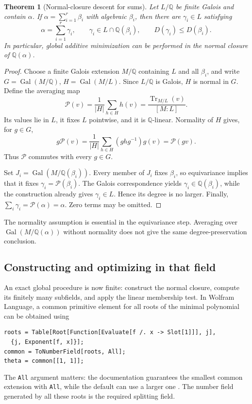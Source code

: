 \documentclass[11pt,letterpaper]{article}
\newtheorem{theorem}{Theorem}[section]
\theoremstyle{definition}
\theoremstyle{remark}
\newcommand{\Q}{\mathbb Q}
\newcommand{\Gal}{\operatorname{Gal}}
\newcommand{\Tr}{\operatorname{Tr}}
\newcommand{\wl}[1]{\texttt{#1}}
\begin{document}
\begin{theorem}[Normal-closure descent for sums]\label{thm:descent}
Let \(L/\Q\) be finite Galois and contain \(\alpha\). If
\(\alpha=\sum_{i=1}^r\beta_i\) with algebraic \(\beta_i\), then there
are \(\gamma_i\in L\) satisfying
\[
 \alpha=\sum_{i=1}^r\gamma_i,\qquad
 \gamma_i\in L\cap\Q(\beta_i),\qquad
 D(\gamma_i)\leq D(\beta_i).
\]
In particular, global additive minimization can be performed in the normal
closure of \(\Q(\alpha)\).
\end{theorem}
\begin{proof}
Choose a finite Galois extension \(M/\Q\) containing \(L\) and all
\(\beta_i\), and write
\(G=\Gal(M/\Q)\), \(H=\Gal(M/L)\). Since \(L/\Q\) is Galois,
\(H\) is normal in \(G\). Define the averaging map
\[
 \mathcal P(v)=\frac1{|H|}\sum_{h\in H}h(v)
             =\frac{\Tr_{M/L}(v)}{[M:L]}.
\]
Its values lie in \(L\), it fixes \(L\) pointwise, and it is
\(\Q\)-linear. Normality of \(H\) gives, for \(g\in G\),
\[
 g\mathcal P(v)=\frac1{|H|}\sum_{h\in H}(ghg^{-1})g(v)
              =\mathcal P(gv).
\]
Thus \(\mathcal P\) commutes with every \(g\in G\).

Set \(J_i=\Gal(M/\Q(\beta_i))\). Every member of \(J_i\) fixes
\(\beta_i\), so equivariance implies that it fixes
\(\gamma_i=\mathcal P(\beta_i)\). The Galois correspondence yields
\(\gamma_i\in\Q(\beta_i)\), while the construction already gives
\(\gamma_i\in L\). Hence its degree is no larger. Finally,
\(\sum_i\gamma_i=\mathcal P(\alpha)=\alpha\). Zero terms may be omitted.
\end{proof}
The normality assumption is essential in the equivariance step. Averaging
over \(\Gal(M/\Q(\alpha))\) without normality does not give the same
degree-preservation conclusion.

\subsection{Constructing and optimizing in that field}
An exact global procedure is now finite: construct the normal closure,
compute its finitely many subfields, and apply the linear membership test.
In Wolfram Language, a common primitive element for all roots of the
minimal polynomial can be obtained using
\begin{lstlisting}
roots = Table[Root[Function[Evaluate[f /. x -> Slot[1]]], j],
  {j, Exponent[f, x]}];
common = ToNumberField[roots, All];
theta = common[[1, 1]];
\end{lstlisting}
The \wl{All} argument matters: the documentation guarantees the smallest
common extension with \wl{All}, while the default can use a larger one
\cite{tonumberfield}. The number field generated by all these roots is
the required splitting field.
\end{document}

